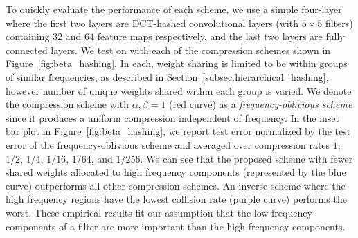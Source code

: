 \documentclass{article} %
\begin{document}
To quickly evaluate the performance of each scheme, we use a simple four-layer \abbrev{} where the first two layers are DCT-hashed convolutional layers (with $5\times 5$ filters) containing $32$ and $64$ feature maps respectively, and the last two layers are fully connected layers.
We test \abbrev{} on  with each of the compression schemes shown in Figure~\ref{fig:beta_hashing}.
In each, weight sharing is limited to be within groups of similar frequencies, as described in Section~\ref{subsec.hierarchical_hashing}, however number of unique weights shared within each group is varied.
We denote the compression scheme with $\alpha,\beta=1$ (red curve) as a \emph{frequency-oblivious scheme} since it produces a uniform compression independent of frequency.
In the inset bar plot in Figure~\ref{fig:beta_hashing}, we report test error normalized by the test error of the frequency-oblivious scheme and averaged over compression rates $1$, $1/2$, $1/4$, $1/16$, $1/64$, and $1/256$.
We can see that the proposed scheme with fewer shared weights allocated to high frequency components (represented by the blue curve) outperforms all other compression schemes.
An inverse scheme where the high frequency regions have the lowest collision rate (purple curve) performs the worst.
These empirical results fit our assumption that the low frequency components of a filter are more important than the high frequency components.
\end{document}
